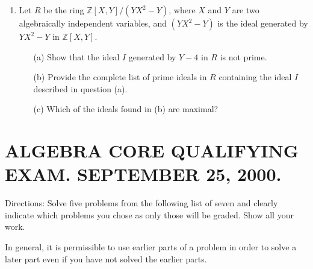 \documentclass{article}
\begin{document}
\begin{enumerate}
    \item Let \(R\) be the ring \(\mathbb{Z}[X,Y]/(YX^2-Y)\), where \(X\) and \(Y\) are two algebraically independent variables, and \((YX^2-Y)\) is the ideal generated by \(YX^2-Y\) in \(\mathbb{Z}[X,Y]\).
    \begin{itemize}
        \item[(a)] Show that the ideal \(I\) generated by \(Y-4\) in \(R\) is not prime.
        \item[(b)] Provide the complete list of prime ideals in \(R\) containing the ideal \(I\) described in question (a).
        \item[(c)] Which of the ideals found in (b) are maximal?
    \end{itemize}
\end{enumerate}

\section*{ALGEBRA CORE QUALIFYING EXAM. SEPTEMBER 25, 2000.}

Directions: Solve five problems from the following list of seven and clearly indicate which problems you chose as only those will be graded. Show all your work.

In general, it is permissible to use earlier parts of a problem in order to solve a later part even if you have not solved the earlier parts.
\end{document}
